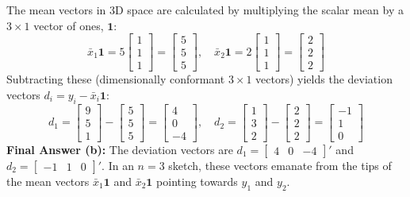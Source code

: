 \documentclass[12pt]{article}
\begin{document}
The mean vectors in 3D space are calculated by multiplying the scalar mean by a $3 \times 1$ vector of ones, $\mathbf{1}$:
$$ \bar{x}_1 \mathbf{1} = 5 \begin{bmatrix} 1 \\ 1 \\ 1 \end{bmatrix} = \begin{bmatrix} 5 \\ 5 \\ 5 \end{bmatrix}, \quad \bar{x}_2 \mathbf{1} = 2 \begin{bmatrix} 1 \\ 1 \\ 1 \end{bmatrix} = \begin{bmatrix} 2 \\ 2 \\ 2 \end{bmatrix} $$
Subtracting these (dimensionally conformant $3 \times 1$ vectors) yields the deviation vectors $d_i = y_i - \bar{x}_i \mathbf{1}$:
$$ d_1 = \begin{bmatrix} 9 \\ 5 \\ 1 \end{bmatrix} - \begin{bmatrix} 5 \\ 5 \\ 5 \end{bmatrix} = \begin{bmatrix} 4 \\ 0 \\ -4 \end{bmatrix}, \quad d_2 = \begin{bmatrix} 1 \\ 3 \\ 2 \end{bmatrix} - \begin{bmatrix} 2 \\ 2 \\ 2 \end{bmatrix} = \begin{bmatrix} -1 \\ 1 \\ 0 \end{bmatrix} $$
\textbf{Final Answer (b):} The deviation vectors are $d_1 = \begin{bmatrix} 4 & 0 & -4 \end{bmatrix}'$ and $d_2 = \begin{bmatrix} -1 & 1 & 0 \end{bmatrix}'$. In an $n=3$ sketch, these vectors emanate from the tips of the mean vectors $\bar{x}_1 \mathbf{1}$ and $\bar{x}_2 \mathbf{1}$ pointing towards $y_1$ and $y_2$.
\end{document}
